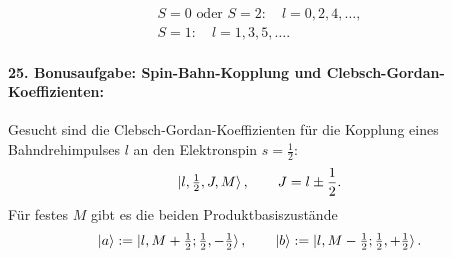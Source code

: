 \documentclass[11pt,a4paper]{scrartcl}
\begin{document}
\begin{enumerate}[label=(\alph*)]
\begin{calculationbox}
\begin{calculationbox}[title=Bosonische Symmetriebedingung]
                \begin{solutionbox}[title=Erlaubte Werte für Spin-$1$-Bosonen]
                    \begin{align*}
                        S=0\text{ oder }S=2:
                        \quad l=0,2,4,\dots,\\
                        S=1:
                        \quad l=1,3,5,\dots.
                    \end{align*}
                \end{solutionbox}
            \end{calculationbox}
        \end{calculationbox}
    \end{enumerate}

    \paragraph{25. Bonusaufgabe: Spin-Bahn-Kopplung und Clebsch-Gordan-Koeffizienten:}

    Gesucht sind die Clebsch-Gordan-Koeffizienten für die Kopplung eines Bahndrehimpulses $l$ an den Elektronspin $s=\frac12$:
    \begin{align*}
        \ket{l,\tfrac12,J,M},
        \qquad
        J=l\pm\frac12.
    \end{align*}
    Für festes $M$ gibt es die beiden Produktbasiszustände
    \begin{align*}
        \ket a
        :=
        \ket{l,M+\tfrac12;\tfrac12,-\tfrac12},
        \qquad
        \ket b
        :=
        \ket{l,M-\tfrac12;\tfrac12,+\tfrac12}.
    \end{align*}
\end{document}
